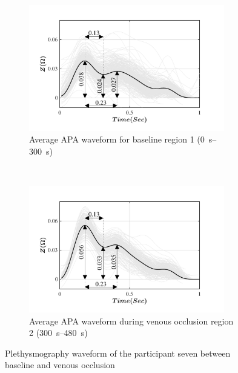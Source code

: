 \begin{figure}[!htbp]
	\centering
	\begin{subfigure}[t]{0.48\textwidth}
		\centering
		\includegraphics[height=5.5cm, trim={0.5cm 0cm 1.5cm 0 cm}, clip]{figure_apa_2a}
		\caption{Average APA waveform for baseline region 1 (\SIrange{0}{300}{\second})}
		\label{fig:iPG_venous_baseline}
	\end{subfigure}%
	~ 
	\begin{subfigure}[t]{0.48\textwidth}
		\centering
		\includegraphics[height=5.5cm, trim={0.5cm 0cm 1.5cm 0 cm}, clip]{figure_apa_2b}
		\caption{Average APA waveform during venous occlusion region 2 (\SIrange{300}{480}{\second})}
		\label{fig:iPG_venous_occlusion}
	\end{subfigure}
	\caption{Plethysmography waveform of the participant seven between baseline and venous occlusion}
	\label{fig:iPG_venous}
\end{figure}

